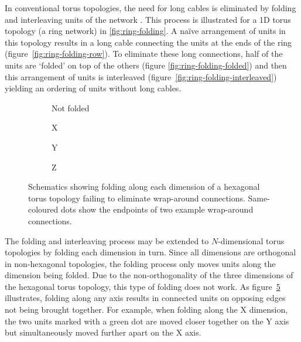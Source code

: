 		In conventional torus topologies, the need for long cables is eliminated by
		folding and interleaving units of the network \cite{dally04}. This process
		is illustrated for a 1D torus topology (a ring network) in
		\ref{fig:ring-folding}. A na\"ive arrangement of units in this topology
		results in a long cable connecting the units at the ends of the ring
		(figure~\ref{fig:ring-folding-row}).  To eliminate these long connections,
		half of the units are `folded' on top of the others (figure
		\ref{fig:ring-folding-folded}) and then this arrangement of units is
		interleaved (figure~\ref{fig:ring-folding-interleaved}) yielding an
		ordering of units without long cables.
		
		\begin{figure}
			\center
			\begin{subfigure}[b]{0.24\linewidth}
				\center
				\caption{Not folded}
				\label{fig:failing-to-fold-hex-toruses-none}
			\end{subfigure}
			\begin{subfigure}[b]{0.24\linewidth}
				\center
				\caption{X}
				\label{fig:failing-to-fold-hex-toruses-x}
			\end{subfigure}
			\begin{subfigure}[b]{0.24\linewidth}
				\center
				\caption{Y}
				\label{fig:failing-to-fold-hex-toruses-y}
			\end{subfigure}
			\begin{subfigure}[b]{0.24\linewidth}
				\center
				\caption{Z}
				\label{fig:failing-to-fold-hex-toruses-z}
			\end{subfigure}
			
			\caption{Schematics showing folding along each dimension of a hexagonal
			torus topology failing to eliminate wrap-around connections.
			Same-coloured dots show the endpoints of two example wrap-around
			connections.}
			\label{fig:failing-to-fold-hex-toruses}
		\end{figure}
		
		The folding and interleaving process may be extended to $N$-dimensional
		torus topologies by folding each dimension in turn. Since all dimensions
		are orthogonal in non-hexagonal topologies, the folding process only moves
		units along the dimension being folded. Due to the non-orthogonality of the
		three dimensions of the hexagonal torus topology, this type of folding does
		not work. As figure~\ref{fig:failing-to-fold-hex-toruses} illustrates,
		folding along any axis results in connected units on opposing edges not
		being brought together. For example, when folding along the X dimension,
		the two units marked with a green dot are moved closer together on the Y
		axis but simultaneously moved further apart on the X axis.
	
